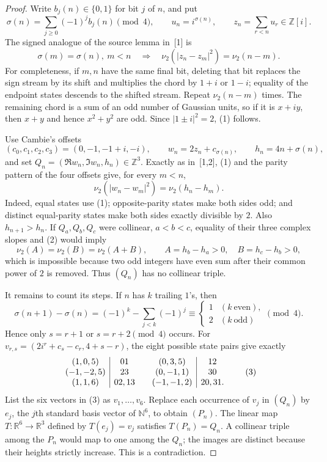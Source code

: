 \documentclass[9pt]{extarticle}
\newcommand{\N}{\mathbb N}
\newcommand{\Z}{\mathbb Z}
\newcommand{\vTwo}{\nu_2}
\begin{document}
\begin{proof}
Write $b_j(n)\in\{0,1\}$ for bit $j$ of $n$, and put
\[
 \sigma(n)=\sum_{j\geq0}(-1)^j b_j(n)\pmod4,\qquad
 u_n=i^{\sigma(n)},\qquad z_n=\sum_{r<n}u_r\in\Z[i].
\]
The signed analogue of the source lemma in~[1] is
\begin{equation}
 \sigma(m)=\sigma(n),\ m<n
 \quad\Longrightarrow\quad
 \vTwo(|z_n-z_m|^2)=\vTwo(n-m).                                      \tag{1}
\end{equation}
For completeness, if $m,n$ have the same final bit, deleting that bit replaces the sign stream by its shift and multiplies the chord by $1+i$ or $1-i$; equality of the endpoint states descends to the shifted stream.  Repeat $\vTwo(n-m)$ times.  The remaining chord is a sum of an odd number of Gaussian units, so if it is $x+iy$, then $x+y$ and hence $x^2+y^2$ are odd.  Since $|1\pm i|^2=2$, (1) follows.

Use Cambie's offsets
\[
 (c_0,c_1,c_2,c_3)=(0,-1,-1+i,-i),\qquad
 w_n=2z_n+c_{\sigma(n)},\qquad h_n=4n+\sigma(n),
\]
and set $Q_n=(\Re w_n,\Im w_n,h_n)\in\Z^3$.  Exactly as in~[1,2], (1) and the parity pattern of the four offsets give, for every $m<n$,
\begin{equation}
 \vTwo(|w_n-w_m|^2)=\vTwo(h_n-h_m).                                  \tag{2}
\end{equation}
Indeed, equal states use (1); opposite-parity states make both sides odd; and distinct equal-parity states make both sides exactly divisible by $2$.  Also $h_{n+1}>h_n$.  If $Q_a,Q_b,Q_c$ were collinear, $a<b<c$, equality of their three complex slopes and (2) would imply
\[
 \vTwo(A)=\vTwo(B)=\vTwo(A+B),\qquad
 A=h_b-h_a>0,\quad B=h_c-h_b>0,
\]
which is impossible because two odd integers have even sum after their common power of $2$ is removed.  Thus $(Q_n)$ has no collinear triple.

It remains to count its steps.  If $n$ has $k$ trailing $1$'s, then
\[
 \sigma(n+1)-\sigma(n)=(-1)^k-\sum_{j<k}(-1)^j
 \equiv\begin{cases}1&(k\ \text{even}),\\2&(k\ \text{odd})\end{cases}\pmod4.
\]
Hence only $s=r+1$ or $s=r+2\pmod4$ occurs.  For
$v_{r,s}=(2i^r+c_s-c_r,4+s-r)$, the eight possible state pairs give exactly
\[
\begin{array}{c|c@{\qquad}c|c}
(1,0,5)&01&(0,3,5)&12\\
(-1,-2,5)&23&(0,-1,1)&30\\
(1,1,6)&02,13&(-1,-1,2)&20,31.
\end{array}                                                            \tag{3}
\]
List the six vectors in (3) as $v_1,\ldots,v_6$.  Replace each occurrence of $v_j$ in $(Q_n)$ by $e_j$, the $j$th standard basis vector of $\N^6$, to obtain $(P_n)$.  The linear map $T:\mathbb R^6\to\mathbb R^3$ defined by $T(e_j)=v_j$ satisfies $T(P_n)=Q_n$.  A collinear triple among the $P_n$ would map to one among the $Q_n$; the images are distinct because their heights strictly increase.  This is a contradiction.
\end{proof}
\end{document}
